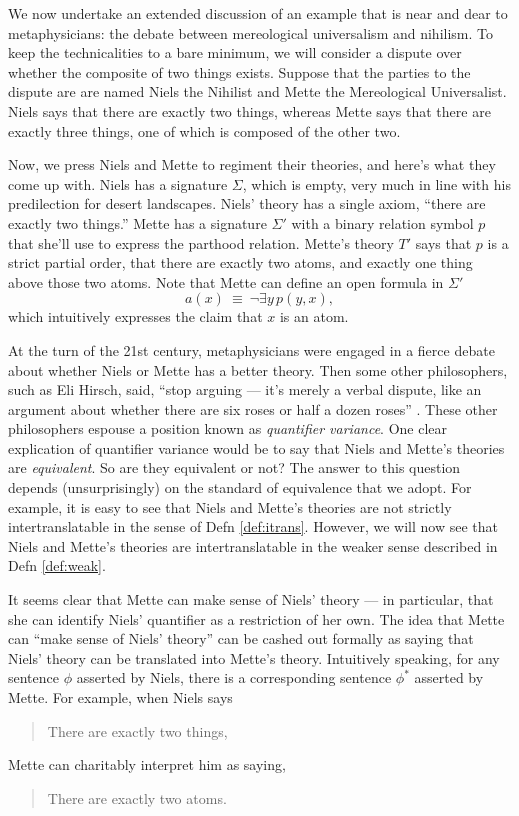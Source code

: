 
\begin{example} \label{go-qv} We now undertake an
  extended discussion of an example that is near and dear to
  metaphysicians: the debate between mereological universalism and
  nihilism.  To keep the technicalities to a bare minimum, we will
  consider a dispute over whether the composite of two things exists.
  Suppose that the parties to the dispute are are named Niels the
  Nihilist and Mette the Mereological Universalist.  Niels says that
  there are exactly two things, whereas Mette says that there are
  exactly three things, one of which is composed of the other two.

  Now, we press Niels and Mette to regiment their theories, and here's
  what they come up with.  Niels has a signature $\Sigma$, which is
  empty, very much in line with his predilection for desert
  landscapes.  Niels' theory has a single axiom, ``there are exactly
  two things.''  Mette has a signature $\Sigma '$ with a binary
  relation symbol $p$ that she'll use to express the parthood
  relation.  Mette's theory $T'$ says that $p$ is a strict partial
  order, that there are exactly two atoms, and exactly one thing above
  those two atoms.  Note that Mette can define an open formula in
  $\Sigma '$
  \[ a(x) \: \equiv \: \neg \exists y\, p(y,x) ,\] which intuitively
  expresses the claim that $x$ is an atom.

  At the turn of the 21st century, metaphysicians were engaged in a
  fierce debate about whether Niels or Mette has a better theory.
  Then some other philosophers, such as Eli Hirsch, said, ``stop
  arguing --- it's merely a verbal dispute, like an argument about
  whether there are six roses or half a dozen roses''
  \citep[see][]{chalmers,hirschbog}.  These other philosophers espouse
  a position known as \emph{quantifier variance}.  One clear
  explication of quantifier variance would be to say that Niels and
  Mette's theories are \emph{equivalent}.  So are they equivalent or
  not?  The answer to this question depends (unsurprisingly) on the
  standard of equivalence that we adopt.  For example, it is easy to
  see that Niels and Mette's theories are not strictly
  intertranslatable in the sense of Defn \ref{def:itrans}.  However,
  we will now see that Niels and Mette's theories are
  intertranslatable in the weaker sense described in Defn
  \ref{def:weak}.

  It seems clear that Mette can make sense of Niels' theory --- in
  particular, that she can identify Niels' quantifier as a restriction
  of her own.  The idea that Mette can ``make sense of Niels' theory''
  can be cashed out formally as saying that Niels' theory can be
  translated into Mette's theory.  Intuitively speaking, for any
  sentence $\phi$ asserted by Niels, there is a corresponding sentence
  $\phi ^*$ asserted by Mette.  For example, when Niels says
  \begin{quote} There are exactly two things,
  \end{quote}
  Mette can charitably interpret him as saying, 
  \begin{quote}
    There are exactly two atoms. \end{quote}


\end{example}
